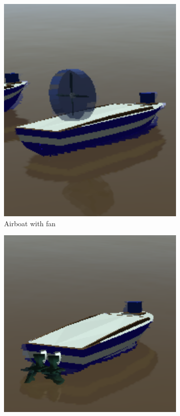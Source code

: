     \begin{figure}[H]
    \centering
    
        \begin{subfigure}[b]{0.44\textwidth}
            \centering
            \includegraphics[scale=0.44]{figs/Chap2/airboat.png}
            \caption{Airboat with fan}
            \label{fig:chap2_airboat}
        \end{subfigure}
        \hfill
        \begin{subfigure}[b]{0.52\textwidth}
            \centering
            \includegraphics[scale=0.48]{figs/Chap2/diffboat2.png}

\end{subfigure}
\end{figure}
